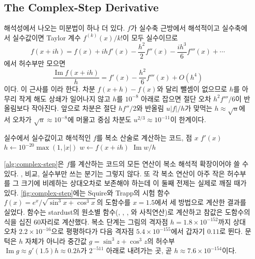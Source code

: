 \subsection{The Complex-Step Derivative}
\label{sec:complex-step}

해석성에서 나오는 미분법이 하나 더 있다. $f$가 실수축 근방에서 해석적이고 실수축에서 실수값이면 Taylor 계수 $f^{(k)}(x)/k!$이 모두 실수이므로
\[
f(x+ih)=f(x)+ihf'(x)-\frac{h^2}{2}f''(x)-\frac{ih^3}{6}f'''(x)+\cdots
\]
에서 허수부만 모으면
\begin{equation}
\label{eq:complex-step}
\frac{\operatorname{Im}f(x+ih)}{h}=f'(x)-\frac{h^2}{6}f'''(x)+O(h^4)
\end{equation}
이다. 이 근사를 이라 한다\cite{lyness1967,squire1998}. 차분 $f(x+h)-f(x)$와 달리 뺄셈이 없으므로 $h$를 아무리 작게 해도 상쇄가 일어나지 않고 $h$를 $10^{-8}$ 아래로 잡으면 절단 오차 $h^2f'''/6$이 반올림보다 작아진다. 앞으로 차분은 절단 $hf''/2$와 반올림 $u|f|/h$가 맞먹는 $h\approx\sqrt u$에서 오차가 $\sqrt u\approx10^{-8}$에 머물고 중심 차분도 $u^{2/3}\approx10^{-11}$이 한계이다.

\begin{algorithm}[htbp]
\begin{algorithmic}[1]
\Require 실수에서 실수값이고 해석적인 $f$를 복소 산술로 계산하는 코드, 점 $x$
\Ensure $f'(x)$
\State $h\gets10^{-20}\max(1,|x|)$ 
\State $w\gets f(x+ih)$ 
\State \Return $\operatorname{Im}w/h$
\end{algorithmic}
\caption{복소 단계 미분}
\label{alg:complex-step}
\end{algorithm}

\cref{alg:complex-step}은 $f$를 계산하는 코드의 모든 연산이 복소 해석적 확장이어야 쓸 수 있다. , 비교, 실수부만 쓰는 분기는 그렇지 않다. 또 각 복소 연산이 아주 작은 허수부를 그 크기에 비례하는 상대오차로 보존해야 하는데 이 둘째 전제는 실제로 깨질 때가 있다. \cref{fig:complex-step}에는 Squire와 Trapp의 시험 함수 $f(x)=e^x/\sqrt{\sin^3x+\cos^3x}$의 도함수를 $x=1.5$에서 세 방법으로 계산한 결과를 실었다. 함수는 stardust의 원소별 함수(, , , 와 사칙연산)로 계산하고 참값은 도함수의 식을 십진 $60$자리로 계산했다. 복소 단계는 그림의 격자점 $h=1.8\times10^{-152}$까지 상대오차 $2.2\times10^{-16}$으로 평평하다가 다음 격자점 $5.4\times10^{-155}$에서 갑자기 $0.11$로 뛴다. 문턱은 $h$ 자체가 아니라 중간값 $g=\sin^3z+\cos^3z$의 허수부 $\operatorname{Im}g\approx g'(1.5)h\approx0.2h$가 $2^{-511}$ 아래로 내려가는 곳, 곧 $h\approx7.6\times10^{-154}$이다.

